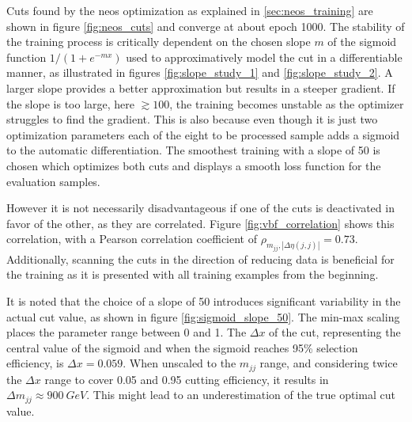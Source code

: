 Cuts found by the \ac{neos} optimization as explained in \ref{sec:neos_training} are shown in figure \ref{fig:neos_cuts} and converge at about epoch 1000. The stability of the training process is critically dependent on the chosen slope $m$ of the sigmoid function $1/(1+e^{-mx})$  used to approximatively model the cut in a differentiable manner, as illustrated in figures \ref{fig:slope_study_1} and \ref{fig:slope_study_2}. A larger slope provides a better approximation but results in a steeper gradient. If the slope is too large, here $\gtrsim 100$, the training becomes unstable as the optimizer struggles to find the gradient. This is also because even though it is just two optimization parameters each of the eight to be processed sample adds a sigmoid to the automatic differentiation. The smoothest training with a slope of 50 is chosen which optimizes both cuts and displays a smooth loss function for the evaluation samples.

However it is not necessarily disadvantageous if one of the cuts is deactivated in favor of the other, as they are correlated. Figure \ref{fig:vbf_correlation} shows this correlation, with a Pearson correlation coefficient of $\rho_{m_{jj},|\Delta\eta(j,j)|}=0.73$. Additionally, scanning the cuts in the direction of reducing data is beneficial for the training as it is presented with all training examples from the beginning.

It is noted that the choice of a slope of 50 introduces significant variability in the actual cut value, as shown in figure \ref{fig:sigmoid_slope_50}. The min-max scaling places the parameter range between 0 and 1. The $\Delta x$ of the cut, representing the central value of the sigmoid and when the sigmoid reaches 95\% selection efficiency, is $\Delta x=0.059$. When unscaled to the $m_{jj}$ range, and considering twice the $\Delta x$ range to cover 0.05 and 0.95 cutting efficiency, it results in $\Delta m_{jj}\approx \qty[]{900}{GeV}$. This might lead to an underestimation of the true optimal cut value.

